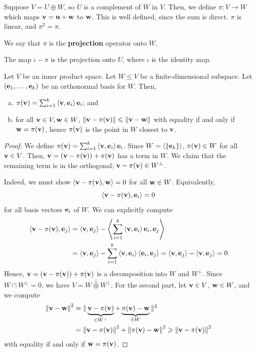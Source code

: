 \documentclass[a4paper,11pt]{article}
\begin{document}
\begin{definition}
	Suppose \( V = U \oplus W \), so \( U \) is a complement of \( W \) in \( V \).
	Then, we define \( \pi \colon V \to W \) which maps \( {\bf v} = {\bf u} + {\bf w} \) to \( {\bf w} \).
	This is well defined, since the sum is direct.
	\( \pi \) is linear, and \( \pi^2 = \pi \).

	We say that \( \pi \) is the \textbf{projection} operator onto \( W \).
\end{definition}
\begin{remark}
	The map \( \iota - \pi \) is the projection onto \( U \), where \( \iota \) is the identity map.
\end{remark}
\begin{lemma}
	Let \( V \) be an inner product space.
	Let \( W \leq V \) be a finite-dimensional subspace.
	Let \( ({\bf e}_1, \dots, {\bf e}_k) \) be an orthonormal basis for \( W \).
	Then,
	\begin{enumerate}[(a)]
		\item \( \pi({\bf v}) = \sum_{i=1}^k \left\langle{{\bf v}, {\bf e}_i}\right\rangle {\bf e}_i \); and
		\item for all \( {\bf v} \in V, {\bf w} \in W \), \( \norm{{\bf v} - \pi({\bf v})} \leqslant \norm{{\bf v} - {\bf w}} \) with equality if and only if \( {\bf w} = \pi({\bf v}) \), hence \( \pi({\bf v}) \) is the point in \( W \) closest to \( {\bf v} \).
	\end{enumerate}
\end{lemma}
\begin{proof}
	We define \( \pi({\bf v}) = \sum_{i=1}^k \left\langle{{\bf v}, {\bf e}_i}\right\rangle {\bf e}_i \).
	Since \( W = \left\langle{} \qty{{\bf e}_k} \right\rangle \), \( \pi({\bf v}) \in W \) for all \( {\bf v} \in V \).
	Then, \( {\bf v} = ({\bf v} - \pi({\bf v})) + \pi({\bf v}) \) has a term in \( W \).
	We claim that the remaining term is in the orthogonal; \( {\bf v} - \pi({\bf v}) \in W^\perp \).

	Indeed, we must show \( \left\langle{{\bf v}- \pi({\bf v}), {\bf w}}\right\rangle = 0 \) for all \( {\bf w} \in W \).
	Equivalently, 
	\[
		\left\langle{{\bf v}- \pi({\bf v}), {\bf e}_i}\right\rangle = 0
	\]
	for all basis vectors \( {\bf e}_i \) of \( W \).
	We can explicitly compute
	\begin{align*}
		\left\langle{{\bf v}- \pi({\bf v}), {\bf e}_j}\right\rangle &= \left\langle{{\bf v}, {\bf e}_j}\right\rangle - \left\langle{\sum_{i=1}^k \left\langle{{\bf v}, {\bf e}_i}\right\rangle {\bf e}_i, {\bf e}_j}\right\rangle \\ 
		&= \left\langle{{\bf v}, {\bf e}_j}\right\rangle - \sum_{i=1}^k \left\langle{{\bf v}, {\bf e}_i}\right\rangle \left\langle{{\bf e}_i, {\bf e}_j}\right\rangle = \left\langle{{\bf v}, {\bf e}_j}\right\rangle - \left\langle{{\bf v}, {\bf e}_j}\right\rangle = 0
	\end{align*}
	Hence, \( {\bf v} = ({\bf v} - \pi({\bf v})) + \pi({\bf v}) \) is a decomposition into \( W \) and \( W^\perp \).
	Since \( W \cap W^\perp = \qty{0} \), we have \( V = W \overset{\perp}{\oplus} W^\perp \).
	For the second part, let \( {\bf v} \in V \), \( {\bf w} \in W \), and we compute
	\begin{align*}
		\norm{{\bf v} - {\bf w}}^2 &= \|\underbrace{{\bf v} - \pi({\bf v})}_{\in W^\perp} + \underbrace{\pi({\bf v}) - {\bf w}}_{\in W}\|^2 \\ 
		&= \norm{{\bf v} - \pi({\bf v})}^2 + \norm{\pi({\bf v}) - {\bf w}}^2 \geqslant \norm{{\bf v} - \pi({\bf v})}^2
	\end{align*}
	with equality if and only if \( {\bf w} = \pi({\bf v}) \).
\end{proof}
\end{document}
